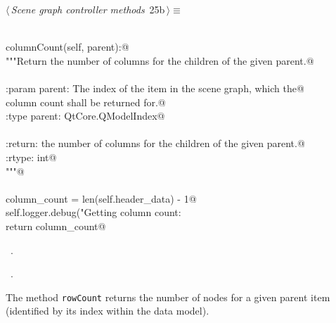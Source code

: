 \documentclass[
    a4paper,      %
    10pt,         %
    openright,    %
    notitlepage,  %
    parskip=half, %
]{scrreprt}       %
\theoremstyle{definition}                    %
\begin{document}
\begin{flushleft} \small
\begin{minipage}{\linewidth}\label{scrap24}\raggedright\small
{} $\langle\,${\itshape Scene graph controller methods}\nobreak\ {\footnotesize {25b}}$\,\rangle\equiv$
\vspace{-1ex}
\begin{list}{}{} \item
\mbox{}\lstinline@@\\
\mbox{}\lstinline@def columnCount(self, parent):@\\
\mbox{}\lstinline@    """Return the number of columns for the children of the given parent.@\\
\mbox{}\lstinline@@\\
\mbox{}\lstinline@    :param parent: The index of the item in the scene graph, which the@\\
\mbox{}\lstinline@                    column count shall be returned for.@\\
\mbox{}\lstinline@    :type  parent: QtCore.QModelIndex@\\
\mbox{}\lstinline@@\\
\mbox{}\lstinline@    :return: the number of columns for the children of the given parent.@\\
\mbox{}\lstinline@    :rtype:  int@\\
\mbox{}\lstinline@    """@\\
\mbox{}\lstinline@@\\
\mbox{}\lstinline@    column_count = len(self.header_data) - 1@\\
\mbox{}\lstinline@    self.logger.debug("Getting column count: %s", column_count)@\\
\mbox{}\lstinline@@\\
\mbox{}\lstinline@    return column_count@\\
\mbox{}\lstinline@@{\NWsep}
\end{list}
\vspace{-1.5ex}
\footnotesize
\begin{list}{}{\setlength{\itemsep}{-\parsep}\setlength{\itemindent}{-\leftmargin}}
\item \NWtxtMacroDefBy\ .
\item \NWtxtMacroRefIn\ .

\item{}
\end{list}
\end{minipage}\vspace{4ex}
\end{flushleft}
The method \verb+rowCount+ returns the number of nodes for a given parent
item (identified by its index within the data model).
\end{document}
